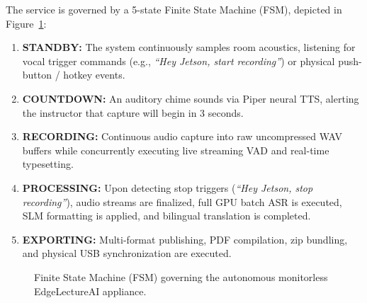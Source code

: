 \documentclass[11pt,a4paper,oneside]{report}
\begin{document}
The service is governed by a 5-state Finite State Machine (FSM), depicted in Figure~\ref{fig:fsm_states}:
\begin{enumerate}[noitemsep]
    \item \textbf{STANDBY:} The system continuously samples room acoustics, listening for vocal trigger commands (e.g., \textit{``Hey Jetson, start recording''}) or physical push-button / hotkey events.
    \item \textbf{COUNTDOWN:} An auditory chime sounds via Piper neural TTS, alerting the instructor that capture will begin in 3 seconds.
    \item \textbf{RECORDING:} Continuous audio capture into raw uncompressed WAV buffers while concurrently executing live streaming VAD and real-time typesetting.
    \item \textbf{PROCESSING:} Upon detecting stop triggers (\textit{``Hey Jetson, stop recording''}), audio streams are finalized, full GPU batch ASR is executed, SLM formatting is applied, and bilingual translation is completed.
    \item \textbf{EXPORTING:} Multi-format publishing, PDF compilation, zip bundling, and physical USB synchronization are executed.
\end{enumerate}

\begin{figure}[htbp]
\centering
{}
\caption{Finite State Machine (FSM) governing the autonomous monitorless EdgeLectureAI appliance.}
\label{fig:fsm_states}
\end{figure}
\end{document}
